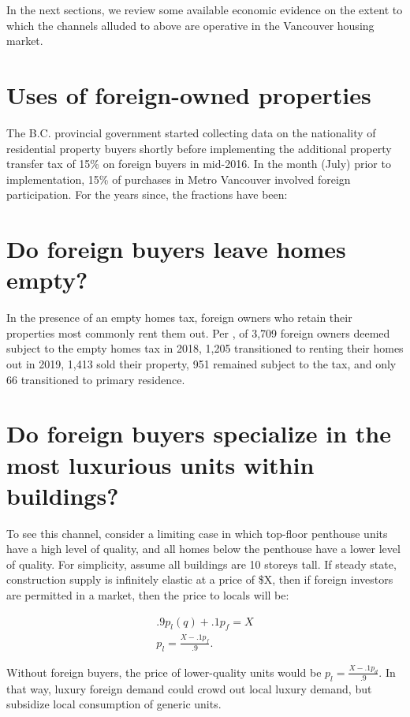 \documentclass[12pt]{article}
\begin{document}
In the next sections, we review some available economic evidence on the extent to which 
the channels alluded to above are operative in the Vancouver housing market.

\section{Uses of foreign-owned properties}

The B.C. provincial government started collecting data on the nationality of
residential property buyers shortly before implementing the additional property
transfer tax of 15\% on foreign buyers in mid-2016. In the month (July) prior
to implementation, 15\% of purchases in Metro Vancouver involved foreign
participation. For the years since, the fractions have been:

\section{Do foreign buyers leave homes empty?}

In the presence of an empty homes tax, foreign owners who retain their
properties most commonly rent them out. Per \textcite{specTax2019}, of 3,709
foreign owners deemed subject to the empty homes tax in 2018, 1,205
transitioned to renting their homes out in 2019, 1,413 sold their property, 951
remained subject to the tax, and only 66 transitioned to primary residence. 

\section{Do foreign buyers specialize in the most luxurious units within buildings?}

To see this channel, consider a limiting case
in which top-floor penthouse units have a high level of quality, and all homes
below the penthouse have a lower level of quality. For simplicity, assume all
buildings are 10 storeys tall. If steady state, construction supply is
infinitely elastic at a price of \$X, then if foreign investors are permitted
in a market, then the price to locals will be:

\begin{align}
	.9p_{l}(q) + .1p_{f} = X\\
	p_{l} = \frac{X - .1p_{f}}{.9}.
\end{align}

Without foreign buyers, the price of lower-quality units would be $p_{l} =
\frac{X-.1p_{d}}{.9}$. In that way, luxury foreign demand could crowd out local
luxury demand, but subsidize local consumption of generic units.
\end{document}
